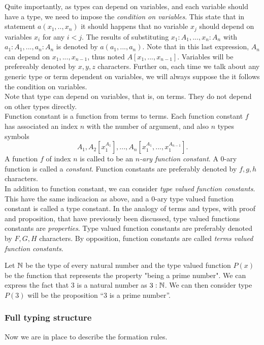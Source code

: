   Quite importantly, as types can depend on variables, and each variable should have a type, we need to impose the \emph{condition on variables}. This state that in statement $a(x_1,..,x_n)$ it should happens that no variable $x_j$ should depend on variables $x_i$ for any $i<j$. The results of substituting $x_1:A_1,...,x_n:A_n$ with $a_1:A_1,...,a_n:A_n$ is denoted by $a(a_1,...,a_n)$. Note that in this last expression, $A_n$ can depend on $x_1,...,x_{n-1}$, thus noted $A[x_1,...,x_{n-1}]$. Variables will be prefereably denoted by $x,y,z$ characters. Further on, each time we talk about any generic type or term dependent on variables, we will always suppose the it follows the condition on variables.\\

Note that type can depend on variables, that is, on terms. They do not depend on other types directly.\\ 
  
Function constant is a function from terms to terms. Each function constant $f$ has associated an index $n$ with the number of argument, and also $n$ types symbols $$A_1, A_2[x_1^{A_1}],...,A_n[x_1^{A_1},...,x_1^{A_{n-1}}].$$ A function $f$ of index $n$ is called to be an \emph{$n$-ary function constant}. A 0-ary function is called a \emph{constant}.  Function constants are preferably denoted by $f,g,h$ characters. \\

In addition to function constant, we can consider \emph{type valued function constants}. This have the same indicacion as above, and a 0-ary type valued function constant is called a type constant. In the analogy of terms and types, with proof and proposition, that have previously been discussed, type valued functions constants are \emph{properties}. Type valued function constants are preferably denoted by $F,G,H$ characters. By opposition, function constants are called \emph{terms valued function constants}.


\begin{example}\label{example:primeML}
Let $\mathbb{N}$ be the type of every natural number and the type valued function $P(x)$ be the function that represents the property "being a prime number". We can express the fact that 3 is a natural number as $3: \mathbb{N}$. We can then consider  type $P(3)$ will be the proposition ``3 is a prime number''. 
\end{example}

\subsubsection{Full typing structure}
Now we are in place to describe the formation rules.

